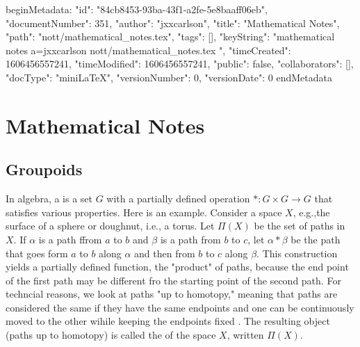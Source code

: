 beginMetadata:
{
    "id": "84cb8453-93ba-43f1-a2fe-5e8baaff06eb",
    "documentNumber": 351,
    "author": "jxxcarlson",
    "title": "Mathematical Notes",
    "path": "nott/mathematical_notes.tex",
    "tags": [],
    "keyString": "mathematical notes a=jxxcarlson nott/mathematical_notes.tex ",
    "timeCreated": 1606456557241,
    "timeModified": 1606456557241,
    "public": false,
    "collaborators": [],
    "docType": "miniLaTeX",
    "versionNumber": 0,
    "versionDate": 0
}
endMetadata


\setcounter{section}{6}

\section{Mathematical Notes}


\innertableofcontents

\subsection{Groupoids}

In algebra, a  is a set $G$ with a partially defined operation $*: G\times G \to G$ that satisfies various properties.  Here is an example. Consider a space $X$, e.g.,the surface of a sphere or doughnut, i.e., a torus.  Let $\Pi(X)$ be the set of paths in  $X$.  If $\alpha$ is a path ffrom $a$ to $b$ and $\beta$ is a path from $b$ to $c$, let $\alpha * \beta$ be the path that goes form $a$ to $b$ along $\alpha$ and then from $b$ to $c$ along $\beta$.  This construction yields a partially defined function, the "product" of paths, because the end point of the first path may be different fro the starting point of the second path.  For techncial reasons, we look at paths "up to homotopy," meaning that paths are considered the same if they have the same endpoints and one can be continuously moved to the other wihile keeping the endpoints fixed . The resulting object (paths up to homotopy) is called the   of the space $X$, written $\Pi(X)$.

